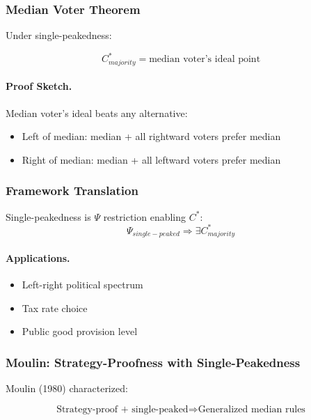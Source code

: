 \subsubsection{Median Voter Theorem}

Under single-peakedness:

\begin{equation}
\boxed{
C^*_{majority} = \text{median voter's ideal point}
}
\label{eq:medianvoter}
\end{equation}

\paragraph{Proof Sketch.}
Median voter's ideal beats any alternative:
\begin{itemize}
    \item Left of median: median + all rightward voters prefer median
    \item Right of median: median + all leftward voters prefer median
\end{itemize}

\subsubsection{Framework Translation}

Single-peakedness is $\Psi$ restriction enabling $C^*$:
\begin{equation}
\Psi_{single-peaked} \Rightarrow \exists C^*_{majority}
\end{equation}

\paragraph{Applications.}
\begin{itemize}
    \item Left-right political spectrum
    \item Tax rate choice
    \item Public good provision level
\end{itemize}

\subsubsection{Moulin: Strategy-Proofness with Single-Peakedness}

Moulin (1980) characterized:

\begin{equation}
\boxed{
\text{Strategy-proof + single-peaked} \Rightarrow \text{Generalized median rules}
}
\label{eq:moulin}
\end{equation}


